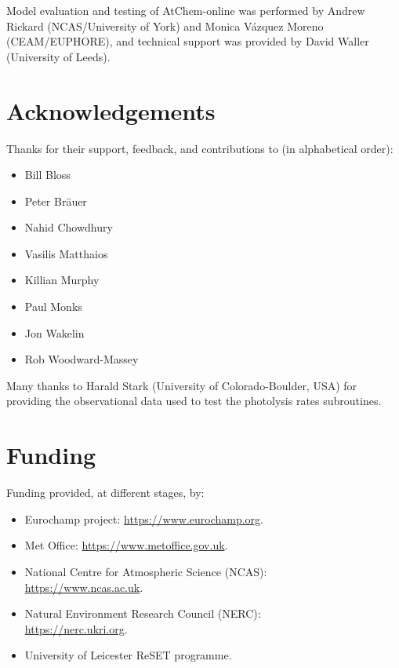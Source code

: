 Model evaluation and testing of AtChem-online was performed by Andrew
Rickard (NCAS/University of York) and Monica V{\'a}zquez Moreno
(CEAM/EUPHORE), and technical support was provided by David Waller
(University of Leeds).

\section{Acknowledgements} \label{sec:acknowledgements}

Thanks for their support, feedback, and contributions to (in alphabetical order):

\begin{itemize}
\item Bill Bloss
\item Peter Br{\"a}uer
\item Nahid Chowdhury
\item Vasilis Matthaios
\item Killian Murphy
\item Paul Monks
\item Jon Wakelin
\item Rob Woodward-Massey
\end{itemize}

Many thanks to Harald Stark (University of Colorado-Boulder, USA) for providing
the observational data used to test the photolysis rates subroutines.

\section{Funding} \label{sec:funding}

Funding provided, at different stages, by:

\begin{itemize}
\item Eurochamp project: \url{https://www.eurochamp.org}.
\item Met Office: \url{https://www.metoffice.gov.uk}.
\item National Centre for Atmospheric Science (NCAS):\\ \url{https://www.ncas.ac.uk}.
\item Natural Environment Research Council (NERC):\\ \url{https://nerc.ukri.org}.
\item University of Leicester ReSET programme.
\end{itemize}
